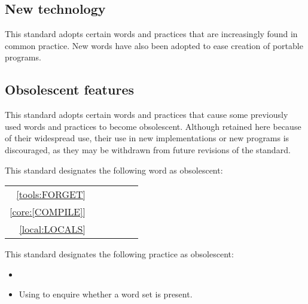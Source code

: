 \subsection{New technology}

This standard adopts certain words and practices that are
increasingly found in common practice. New words have also
been adopted to ease creation of portable programs.

\subsection{Obsolescent features}
\label{intro:obsoleat}

This standard adopts certain words and practices that cause
some previously used words and practices to become obsolescent.
Although retained here because of their widespread use, their
use in new implementations or new programs is discouraged,
as they may be withdrawn from future revisions of the standard.

This standard designates the following word as obsolescent:

\cbstart
\begin{tabular}{rl@{\qquad}rl@{\qquad}rl}
	\ref{tools:FORGET}	& \word[tools]{FORGET}	\\
	\uline{\ref{core:[COMPILE]}}	& \uline{\word{[COMPILE]}} \\
	\uline{\ref{local:LOCALS}}	& \uline{\word[local]{LOCALS}}
\end{tabular}
\cbend

This standard designates the following practice as obsolescent:

\begin{itemize}
\item {}

\item Using  to enquire whether a word set is present.
\end{itemize}
